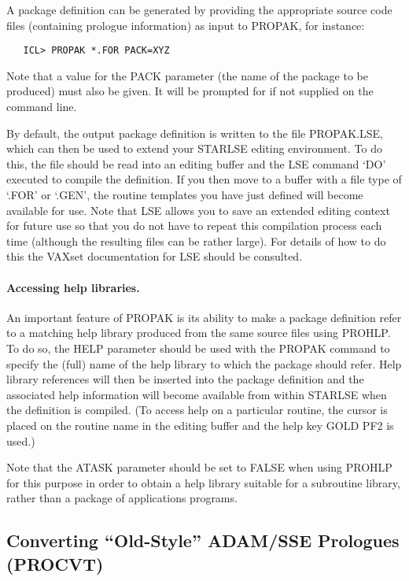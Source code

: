 A package definition can be generated by providing the appropriate source
code files (containing prologue information) as input to PROPAK, for
instance: 

\begin{verbatim}
   ICL> PROPAK *.FOR PACK=XYZ
\end{verbatim}

Note that a value for the PACK parameter (the name of the package to be
produced) must also be given.
It will be prompted for if not supplied on the command line. 

By default, the output package definition is written to the file PROPAK.LSE,
which can then be used to extend your STARLSE editing environment. 
To do this, the file should be read into an editing buffer and the LSE
command `DO' executed to compile the definition. 
If you then move to a buffer with a file type of `.FOR' or `.GEN', the
routine templates you have just defined will become available for use. 
Note that LSE allows you to save an extended editing context for future use
so that you do not have to repeat this compilation process each time
(although the resulting files can be rather large). 
For details of how to do this the VAXset documentation for LSE should be
consulted. 

\paragraph{Accessing help libraries.}
An important feature of PROPAK is its ability to make a package definition
refer to a matching help library produced from the same source files using
PROHLP. 
To do so, the HELP parameter should be used with the PROPAK command to
specify the (full) name of the help library to which the package should
refer. 
Help library references will then be inserted into the package definition
and the associated help information will become available from within
STARLSE when the definition is compiled. 
(To access help on a particular routine, the cursor is placed on the routine
name in the editing buffer and the help key GOLD PF2 is used.) 

Note that the ATASK parameter should be set to FALSE when using PROHLP for
this purpose in order to obtain a help library suitable for a subroutine
library, rather than a package of applications programs. 


\subsection{Converting ``Old-Style'' ADAM/SSE Prologues (PROCVT)}
\label{sect:procvt}

